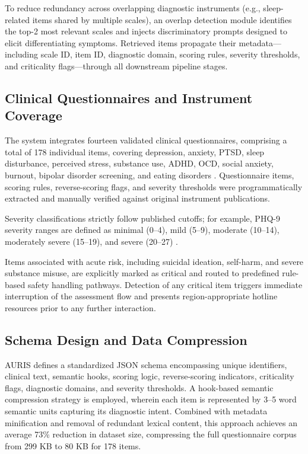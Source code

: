 \documentclass[sigconf]{acmart}
\begin{document}
To reduce redundancy across overlapping diagnostic instruments (e.g., sleep-related items shared by multiple scales), an overlap detection module identifies the top-2 most relevant scales and injects discriminatory prompts designed to elicit differentiating symptoms. Retrieved items propagate their metadata---including scale ID, item ID, diagnostic domain, scoring rules, severity thresholds, and criticality flags---through all downstream pipeline stages.

\subsection{Clinical Questionnaires and Instrument Coverage}

The system integrates fourteen validated clinical questionnaires, comprising a total of 178 individual items, covering depression, anxiety, PTSD, sleep disturbance, perceived stress, substance use, ADHD, OCD, social anxiety, burnout, bipolar disorder screening, and eating disorders \cite{kroenke2001,spitzer2006,weathers2013,bastien2001,cohen1983,kessler2005,babor2001}. Questionnaire items, scoring rules, reverse-scoring flags, and severity thresholds were programmatically extracted and manually verified against original instrument publications.

Severity classifications strictly follow published cutoffs; for example, PHQ-9 severity ranges are defined as minimal (0--4), mild (5--9), moderate (10--14), moderately severe (15--19), and severe (20--27) \cite{kroenke2001}.

Items associated with acute risk, including suicidal ideation, self-harm, and severe substance misuse, are explicitly marked as critical and routed to predefined rule-based safety handling pathways. Detection of any critical item triggers immediate interruption of the assessment flow and presents region-appropriate hotline resources prior to any further interaction.

\subsection{Schema Design and Data Compression}

AURIS defines a standardized JSON schema encompassing unique identifiers, clinical text, semantic hooks, scoring logic, reverse-scoring indicators, criticality flags, diagnostic domains, and severity thresholds. A hook-based semantic compression strategy is employed, wherein each item is represented by 3--5 word semantic units capturing its diagnostic intent. Combined with metadata minification and removal of redundant lexical content, this approach achieves an average 73\% reduction in dataset size, compressing the full questionnaire corpus from 299 KB to 80 KB for 178 items.
\end{document}
